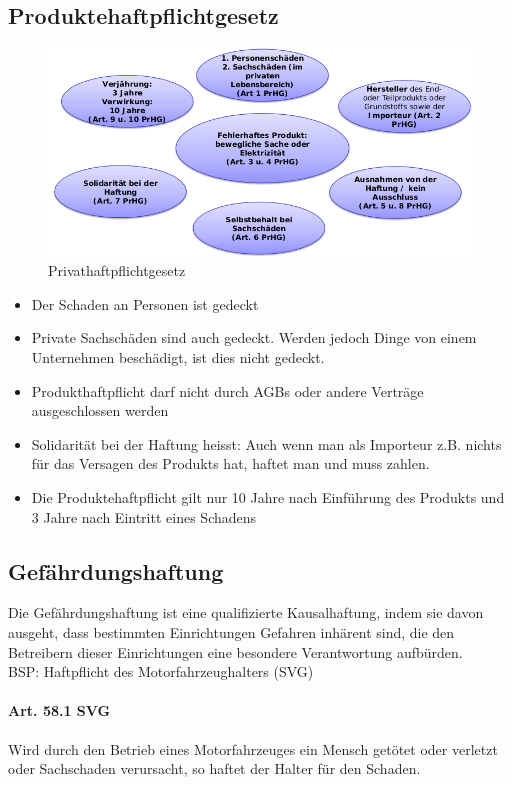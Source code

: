 \subsection{Produktehaftpflichtgesetz}

\begin{figure}[H]
	\centering
	\includegraphics[width=.8\textwidth]{figures/produkthaftpflicht.png}
	\caption{Privathaftpflichtgesetz}
\end{figure}

\begin{itemize}
	\tightlist
	\item Der Schaden an Personen ist gedeckt
	\item Private Sachschäden sind auch gedeckt. Werden jedoch Dinge von einem
	Unternehmen beschädigt, ist dies nicht gedeckt.
	\item Produkthaftpflicht darf nicht durch AGBs oder andere Verträge
	ausgeschlossen werden
	\item Solidarität bei der Haftung heisst: Auch wenn man als Importeur z.B.
	nichts für das Versagen des Produkts hat, haftet man und muss zahlen.
	\item Die Produktehaftpflicht gilt nur 10 Jahre nach Einführung des Produkts
	und 3 Jahre nach Eintritt eines Schadens
\end{itemize}

\subsection{Gefährdungshaftung}
\label{sec:Haftpflicht-Gefaerdungshaftung}
Die Gefährdungshaftung ist eine qualifizierte Kausalhaftung, indem sie
davon ausgeht, dass bestimmten Einrichtungen Gefahren inhärent sind, die
den Betreibern dieser Einrichtungen eine besondere Verantwortung
aufbürden.\\
BSP: Haftpflicht des Motorfahrzeughalters (SVG)

\paragraph{Art. 58.1 SVG}
Wird durch den Betrieb eines Motorfahrzeuges ein Mensch getötet oder
verletzt oder Sachschaden verursacht, so haftet der Halter für den
Schaden.


